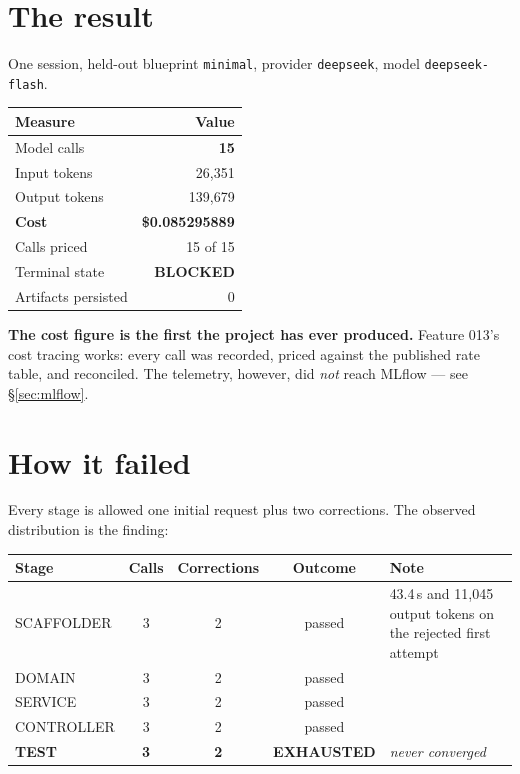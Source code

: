 \documentclass[11pt,a4paper]{article}
\begin{document}
\tableofcontents
\vspace{0.5cm}

\section{The result}

One session, held-out blueprint \texttt{minimal}, provider \texttt{deepseek},
model \texttt{deepseek-flash}.

\begin{center}
\begin{tabular}{@{}lr@{}}
\toprule
\textbf{Measure} & \textbf{Value} \\
\midrule
Model calls & \textbf{15} \\
Input tokens & 26{,}351 \\
Output tokens & 139{,}679 \\
\textbf{Cost} & \textbf{\$0.085295889} \\
Calls priced & 15 of 15 \\
Terminal state & \textbf{BLOCKED} \\
Artifacts persisted & 0 \\
\bottomrule
\end{tabular}
\end{center}

\textbf{The cost figure is the first the project has ever produced.} Feature 013's
cost tracing works: every call was recorded, priced against the published rate
table, and reconciled. The telemetry, however, did \emph{not} reach MLflow --- see
\S\ref{sec:mlflow}.

\section{How it failed}

Every stage is allowed one initial request plus two corrections. The observed
distribution is the finding:

\begin{center}
\begin{tabular}{@{}lccc l@{}}
\toprule
\textbf{Stage} & \textbf{Calls} & \textbf{Corrections} & \textbf{Outcome} & \textbf{Note} \\
\midrule
SCAFFOLDER & 3 & 2 & passed & 43.4\,s and 11{,}045 output tokens on the rejected first attempt \\
DOMAIN & 3 & 2 & passed & \\
SERVICE & 3 & 2 & passed & \\
CONTROLLER & 3 & 2 & passed & \\
\textbf{TEST} & \textbf{3} & \textbf{2} & \textbf{EXHAUSTED} & \emph{never converged} \\
\bottomrule
\end{tabular}
\end{center}
\end{document}
